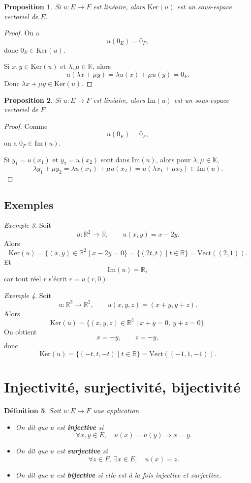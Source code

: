 \documentclass[11pt,a4paper]{article}
\newtheorem{definition}{Définition}[section]
\newtheorem{proposition}[definition]{Proposition}
\theoremstyle{remark}
\newtheorem{exemple}[definition]{Exemple}
\newcommand{\R}{\mathbb{R}}
\newcommand{\K}{\mathbb{K}}
\newcommand{\Vect}{\mathrm{Vect}}
\newcommand{\Ker}{\mathrm{Ker}}
\newcommand{\Img}{\mathrm{Im}}
\begin{document}
\begin{proposition}
Si \(u:E\to F\) est linéaire, alors \(\Ker(u)\) est un sous-espace vectoriel de \(E\).
\end{proposition}

\begin{proof}
On a
\[
u(0_E)=0_F,
\]
donc \(0_E\in\Ker(u)\).

Si \(x,y\in\Ker(u)\) et \(\lambda,\mu\in\K\), alors
\[
u(\lambda x+\mu y)=\lambda u(x)+\mu u(y)=0_F.
\]
Donc \(\lambda x+\mu y\in\Ker(u)\).
\end{proof}

\begin{proposition}
Si \(u:E\to F\) est linéaire, alors \(\Img(u)\) est un sous-espace vectoriel de \(F\).
\end{proposition}

\begin{proof}
Comme
\[
u(0_E)=0_F,
\]
on a \(0_F\in\Img(u)\).

Si \(y_1=u(x_1)\) et \(y_2=u(x_2)\) sont dans \(\Img(u)\), alors pour \(\lambda,\mu\in\K\),
\[
\lambda y_1+\mu y_2=\lambda u(x_1)+\mu u(x_2)=u(\lambda x_1+\mu x_2)\in\Img(u).
\]
\end{proof}

\subsection{Exemples}

\begin{exemple}
Soit
\[
u:\R^2\to\R,\qquad u(x,y)=x-2y.
\]
Alors
\[
\Ker(u)=\{(x,y)\in\R^2\mid x-2y=0\}
=
\{(2t,t)\mid t\in\R\}
=
\Vect((2,1)).
\]
Et
\[
\Img(u)=\R,
\]
car tout réel \(r\) s’écrit \(r=u(r,0)\).
\end{exemple}

\begin{exemple}
Soit
\[
u:\R^3\to\R^2,\qquad u(x,y,z)=(x+y,y+z).
\]
Alors
\[
\Ker(u)=\{(x,y,z)\in\R^3\mid x+y=0,\ y+z=0\}.
\]
On obtient
\[
x=-y,\qquad z=-y,
\]
donc
\[
\Ker(u)=\{(-t,t,-t)\mid t\in\R\}=\Vect((-1,1,-1)).
\]
\end{exemple}

\section{Injectivité, surjectivité, bijectivité}

\begin{definition}
Soit \(u:E\to F\) une application.
\begin{itemize}
    \item On dit que \(u\) est \textbf{injective} si
    \[
    \forall x,y\in E,\quad u(x)=u(y)\Longrightarrow x=y.
    \]
    \item On dit que \(u\) est \textbf{surjective} si
    \[
    \forall z\in F,\ \exists x\in E,\quad u(x)=z.
    \]
    \item On dit que \(u\) est \textbf{bijective} si elle est à la fois injective et surjective.
\end{itemize}
\end{definition}
\end{document}
